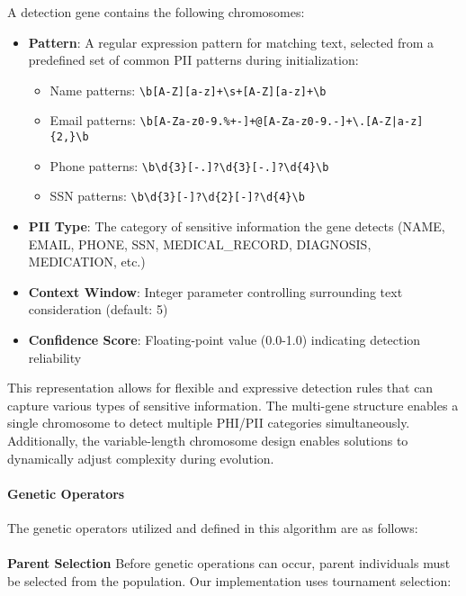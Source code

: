 \documentclass[conference]{IEEEtran}
\begin{document}
A detection gene contains the following chromosomes:
\begin{itemize}
\item \textbf{Pattern}: A regular expression pattern for matching text, selected from a predefined set of common PII patterns during initialization:
  \begin{itemize}
  \item Name patterns: \texttt{\textbackslash b[A-Z][a-z]+\textbackslash s+[A-Z][a-z]+\textbackslash b}
  \item Email patterns: \texttt{\textbackslash b[A-Za-z0-9.\%+-]+@[A-Za-z0-9.-]+\textbackslash.[A-Z|a-z]\{2,\}\textbackslash b}
  \item Phone patterns: \texttt{\textbackslash b\textbackslash d\{3\}[-.]?\textbackslash d\{3\}[-.]?\textbackslash d\{4\}\textbackslash b}
  \item SSN patterns: \texttt{\textbackslash b\textbackslash d\{3\}[-]?\textbackslash d\{2\}[-]?\textbackslash d\{4\}\textbackslash b}
  \end{itemize}
\item \textbf{PII Type}: The category of sensitive information the gene detects (NAME, EMAIL, PHONE, SSN, MEDICAL\_RECORD, DIAGNOSIS, MEDICATION, etc.)
\item \textbf{Context Window}: Integer parameter controlling surrounding text consideration (default: 5)
\item \textbf{Confidence Score}: Floating-point value (0.0-1.0) indicating detection reliability
\end{itemize}

This representation allows for flexible and expressive detection rules that can capture various types of sensitive information. The multi-gene structure enables a single chromosome to detect multiple PHI/PII categories simultaneously. Additionally, the variable-length chromosome design enables solutions to dynamically adjust complexity during evolution.

\paragraph{\textbf{Genetic Operators}}
The genetic operators utilized and defined in this algorithm are as follows:
\\
\\
\textbf{Parent Selection}
Before genetic operations can occur, parent individuals must be selected from the population. Our implementation uses tournament selection:
\end{document}
